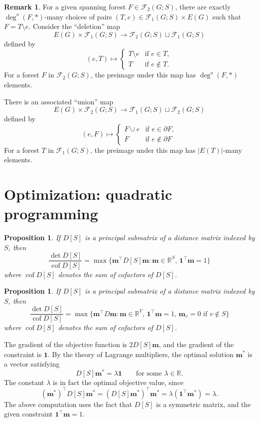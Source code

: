 \documentclass{amsart}
\newtheorem{prop}[thm]{Proposition}
\theoremstyle{definition}
\newtheorem{rmk}[thm]{Remark}
\newcommand{\RR}{\mathbb{R}}
\newcommand{\bone}{\mathbf{1}}
\newcommand{\boldm}{\mathbf{m}}
\newcommand{\tr}{\intercal}
\DeclareMathOperator{\cof}{cof}
\newcommand{\trees}{\mathcal{F}_1}
\newcommand{\forests}{\mathcal{F}}
\newcommand{\degout}{\deg^o}
\newcommand{\note}[1]{{\color{red} \sf $\diamondsuit$  {#1} $\diamondsuit$ }}
\begin{document}
\begin{rmk}
For a given spanning forest
$F \in \forests_2(G;S)$,
there are exactly $\degout(F, *)$-many choices of pairs $(T,e) \in \trees(G;S) \times E(G)$ such that
$F = T \setminus e.$
Consider the ``deletion'' map
\[
	E(G) \times \trees(G;S) \to \forests_2(G;S) \sqcup \trees(G;S)
\]
defined by
\[
	(e, T) \mapsto \begin{cases}
	T \setminus e &\text{if } e\in T,\\
	T &\text{if } e\not\in T.
	\end{cases}
\]
For a forest $F$ in $\forests_2(G;S)$,
the preimage under this map has $\degout(F,*)$ elements.

There is an associated ``union'' map 
\[
	E(G) \times \forests_2(G;S) \longrightarrow \trees(G;S) \sqcup \forests_2(G;S)
\]
defined by
\[
	(e, F) \mapsto \begin{cases}
		F \cup e &\text{if } e \in \partial F, \\
		F &\text{if } e \not\in \partial F
	\end{cases}
\]
For a forest $T$ in $\trees(G; S)$, the preimage under this map has $|E(T)|$-many elements.
\end{rmk}


\section{Optimization: quadratic programming}
\label{sec:optimization}

\begin{prop}
If $D[S]$ is a principal submatrix of a distance matrix indexed by $S$, then 
\[
	\frac{\det D[S]}{\cof D[S]} = \max \{\boldm^\tr D[S] \boldm : \boldm \in \RR^S,\, \bone^\tr \boldm = 1 \}
\]
where $\cof D[S]$ denotes the sum of cofactors of $D[S]$.
\end{prop}

\begin{prop}
If $D[S]$ is a principal submatrix of a distance matrix indexed by $S$, then 
\[
	\frac{\det D[S]}{\cof D[S]} = \max \{\boldm^\tr D \boldm : \boldm \in \RR^V,\, \bone^\tr \boldm = 1,\, \boldm_v = 0 \text{ if } v \not\in S \}
\]
where $\cof D[S]$ denotes the sum of cofactors of $D[S]$.
\end{prop}

The gradient of the objective function is $2 D[S] \boldm$, 
and the gradient of the constraint is $\bone$.
By the theory of Lagrange multipliers, the optimal solution $\boldm^*$ is a vector satisfying
\[
	D[S] \boldm^* = \lambda \bone \qquad\text{for some }\lambda \in \RR.
\]
The constant $\lambda$ is in fact the optimal objective value, since
\[
	(\boldm^*)^\tr D[S] \boldm^* = (D[S] \boldm^*)^\tr \boldm^* = \lambda (\bone^\tr \boldm^*) = \lambda.
\]
The above computation uses the fact that $D[S]$ is a symmetric matrix, and the given constraint $\bone^\tr \boldm = 1$.
\end{document}
